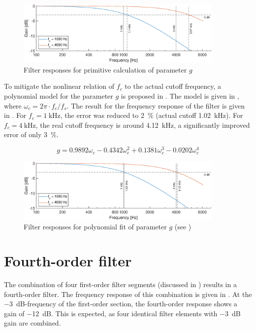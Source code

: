 \documentclass[a4paper, 12pt]{article}
\begin{document}
\begin{figure} [!ht]
	\centering
	\includegraphics[width=0.9\textwidth]{primitive-responses.eps}
	\caption{Filter responses for primitive calculation of parameter $g$}
	\label{fig:prim-resp}
\end{figure}

To mitigate the nonlinear relation of $f_c$ to the actual cutoff frequency, a polynomial model for the parameter $g$ is proposed in \cite{Vaelimaeki2006}. The model is given in , where $\omega_c = 2 \pi \cdot f_c / f_s$. The result for the frequency response of the filter is given in . For $f_c = \SI{1}{\kilo\hertz}$, the error was reduced to \SI{2}{\percent} (actual cutoff \SI{1.02}{\kilo\hertz}). For $f_c = \SI{4}{\kilo\hertz}$, the real cutoff frequency is around \SI{4.12}{\kilo\hertz}, a significantly improved error of only \SI{3}{\percent}.

\begin{equation}
	\label{eq:polynom-fit}
	g = 0.9892 \omega_c - 0.4342 \omega_c^2 + 0.1381 \omega_c^3 - 0.0202 \omega_c^4
\end{equation}

\begin{figure}
	\centering
	\includegraphics[width=0.9\textwidth]{improved-responses.eps}
	\caption{Filter responses for polynomial fit of parameter $g$ (see )}
	\label{fig:ext-resp}
\end{figure}

\section{Fourth-order filter} \label{sec:fourth-order}
The combination of four first-order filter segments (discussed in ) results in a fourth-order filter. The frequency response of this combination is given in . At the \SI{-3}{\deci\bel}-frequency of the first-order section, the fourth-order response shows a gain of \SI{-12}{\deci\bel}. This is expected, as four identical filter elements with \SI{-3}{\deci\bel} gain are combined.
\end{document}
